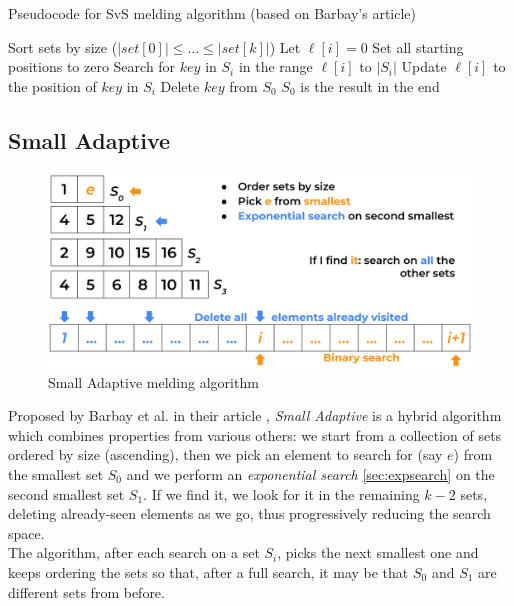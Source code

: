 \begin{algorithm}
    \captionsetup{labelsep=newline}
    \caption{Pseudocode for SvS melding algorithm \label{alg:svs} (based on Barbay's article)}
    \begin{algorithmic}[1]
        \State Sort sets by size \big($\big|set[0]\big| \leq \ldots \leq \big|set[k]\big|$\big)
            \State Let $\ell[i]=0$ \Comment Set all starting positions to zero
        \EndFor
                \State Search for $key$ in $S_i$ in the range $\ell[i]$ to $|S_i|$
                \State Update $\ell[i]$ to the position of $key$ in $S_i$
                    \State Delete $key$ from $S_0$ \Comment $S_0$ is the result in the end
                \EndIf
            \EndFor
        \EndFor
    \end{algorithmic}
\end{algorithm}

\subsection{Small Adaptive \label{sec:smalladaptive}}

\begin{figure}[H] 
    \begin{center}
        \includegraphics[width=.8\textwidth]{imgs/smalladaptive.png}
        \caption{Small Adaptive melding algorithm \label{fig:smalladaptive}}
    \end{center}
\end{figure}

Proposed by Barbay et al. in their article \citep{barbay_ortiz}, \textit{Small Adaptive} is a hybrid algorithm which combines properties from various others: we start from a collection of sets ordered by size (ascending), then we pick an element to search for (say $e$) from the smallest set $S_0$ and we perform an \textit{exponential search} \ref{sec:expsearch} on the second smallest set $S_1$. If we find it, we look for it in the remaining $k-2$ sets, deleting already-seen elements as we go, thus progressively reducing the search space. \\
The algorithm, after each search on a set $S_i$, picks the next smallest one and keeps ordering the sets so that, after a full search, it may be that $S_0$ and $S_1$ are different sets from before.

